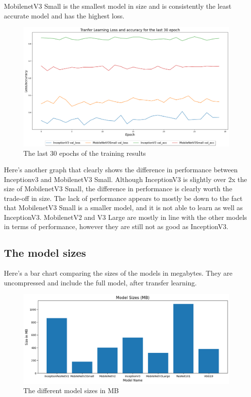 \documentclass[]{final_report}
\begin{document}
MobilenetV3 Small is the smallest model in size and is consistently the least accurate model and has the highest loss.

\begin{figure}[ht!]
  \centering
  \includegraphics[width=120mm]{images/mobilenet-v3-small-vs-inception-v3.png}
  \caption{The last 30 epochs of the training results}
\end{figure}

Here's another graph that clearly shows the difference in performance between Inceptionv3 and MobilenetV3 Small.
Although InceptionV3 is slightly over 2x the size of MobilenetV3 Small, the difference in performance is clearly worth the trade-off in size.
The lack of performance appears to mostly be down to the fact that MobilenetV3 Small is a smaller model, and it is not able to learn as well as InceptionV3.
MobilenetV2 and V3 Large are mostly in line with the other models in terms of performance, however they are still not as good as InceptionV3.

\pagebreak
\subsection{The model sizes}

Here's a bar chart comparing the sizes of the models in megabytes. 
They are uncompressed and include the full model, after transfer learning.

\begin{figure}[ht!]
  \centering
  \includegraphics[width=120mm]{images/model-sizes.png}
  \caption{The different model sizes in MB}
\end{figure}
\end{document}
